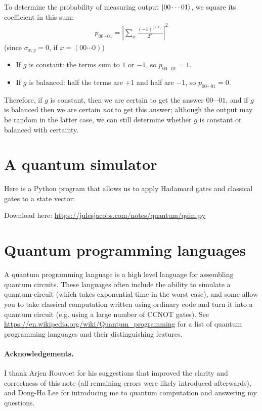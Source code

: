 To determine the probability of measuring output $\ket{00\cdots01}$, we square its coefficient in this sum:
\begin{align*}
  p_{00\cdots01} =\left|\sum_x \frac{(-1)^{g(x)}}{2^n}\right|^2
\end{align*}
(since $\sigma_{x,y} = 0$, if $x = (00\cdots0)$)

\begin{itemize}
  \item If $g$ is constant: the terms sum to $1$ or $-1$, so $p_{00\cdots01} = 1$.
  \item If $g$ is balanced: half the terms are $+1$ and half are $-1$, so $p_{00\cdots01} = 0$.
\end{itemize}
Therefore, if $g$ is constant, then we are certain to get the answer $00\cdots01$,
and if $g$ is balanced then we are certain \emph{not} to get this answer;
although the output may be random in the latter case, we can still determine whether $g$ is constant or balanced with certainty.

\section{A quantum simulator}

Here is a Python program that allows us to apply Hadamard gates and classical gates to a state vector:


Download here: \url{https://julesjacobs.com/notes/quantum/qsim.py}

\section{Quantum programming languages}

A quantum programming language is a high level language for assembling quantum circuits.
These languages often include the ability to simulate a quantum circuit (which takes exponential time in the worst case),
and some allow you to take classical computation written using ordinary code and turn it into a quantum circuit (e.g. using a large number of CCNOT gates).
See \url{https://en.wikipedia.org/wiki/Quantum_programming} for a list of quantum programming languages and their distinguishing features.

\paragraph{Acknowledgements.}
I thank Arjen Rouvoet for his suggestions that improved the clarity and correctness of this note (all remaining errors were likely introduced afterwards),
and Dong-Ho Lee for introducing me to quantum computation and answering my questions.






